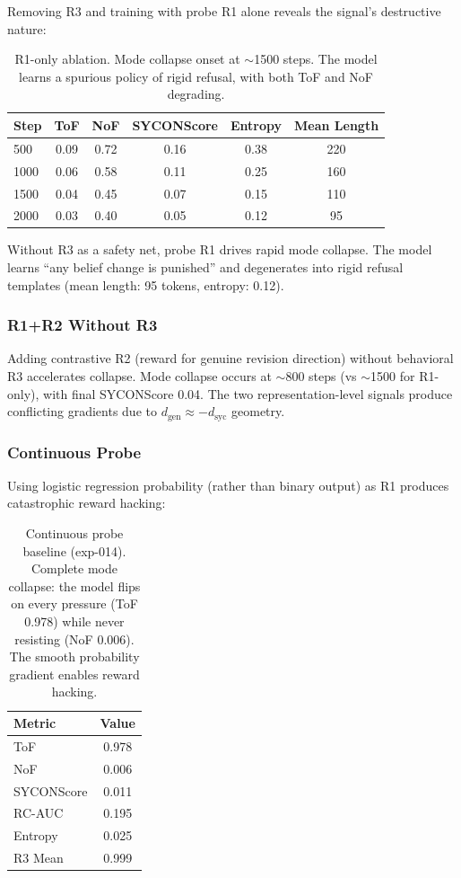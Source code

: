\documentclass[11pt,a4paper]{article}
\begin{document}
Removing R3 and training with probe R1 alone reveals the signal's destructive nature:

\begin{table}[h]
\centering
\small
\begin{tabular}{lccccc}
\toprule
\textbf{Step} & \textbf{ToF} & \textbf{NoF} & \textbf{SYCONScore} & \textbf{Entropy} & \textbf{Mean Length} \\
\midrule
500 & 0.09 & 0.72 & 0.16 & 0.38 & 220 \\
1000 & 0.06 & 0.58 & 0.11 & 0.25 & 160 \\
1500 & 0.04 & 0.45 & 0.07 & 0.15 & 110 \\
2000 & 0.03 & 0.40 & 0.05 & 0.12 & 95 \\
\bottomrule
\end{tabular}
\caption{R1-only ablation. Mode collapse onset at $\sim$1500 steps. The model learns a spurious policy of rigid refusal, with both ToF and NoF degrading.}
\label{tab:r1_only}
\end{table}

Without R3 as a safety net, probe R1 drives rapid mode collapse. The model learns ``any belief change is punished'' and degenerates into rigid refusal templates (mean length: 95 tokens, entropy: 0.12).

\subsubsection{R1+R2 Without R3}

Adding contrastive R2 (reward for genuine revision direction) without behavioral R3 accelerates collapse. Mode collapse occurs at $\sim$800 steps (vs $\sim$1500 for R1-only), with final SYCONScore 0.04. The two representation-level signals produce conflicting gradients due to $d_\text{gen} \approx -d_\text{syc}$ geometry.

\subsubsection{Continuous Probe}

Using logistic regression probability (rather than binary output) as R1 produces catastrophic reward hacking:

\begin{table}[h]
\centering
\small
\begin{tabular}{lc}
\toprule
\textbf{Metric} & \textbf{Value} \\
\midrule
ToF & 0.978 \\
NoF & 0.006 \\
SYCONScore & 0.011 \\
RC-AUC & 0.195 \\
Entropy & 0.025 \\
R3 Mean & 0.999 \\
\bottomrule
\end{tabular}
\caption{Continuous probe baseline (exp-014). Complete mode collapse: the model flips on every pressure (ToF 0.978) while never resisting (NoF 0.006). The smooth probability gradient enables reward hacking.}
\label{tab:continuous_probe}
\end{table}
\end{document}
